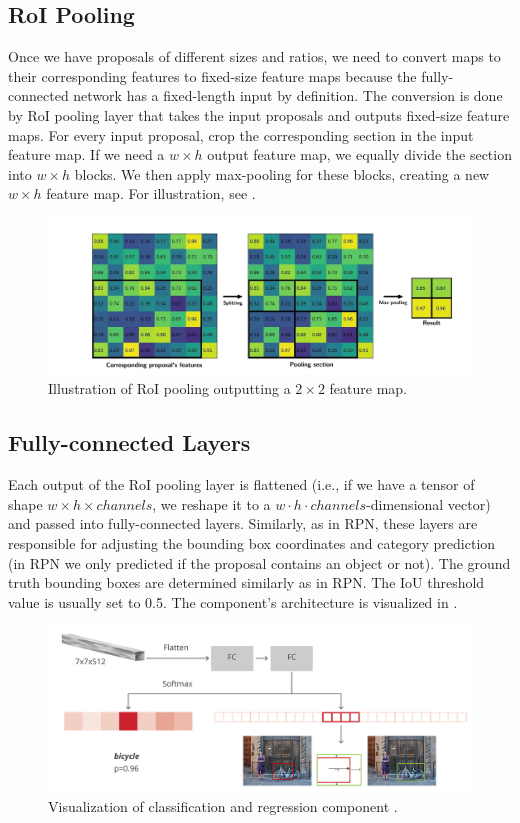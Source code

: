 \subsection{RoI Pooling}
Once we have proposals of different sizes and ratios, we need to convert
maps to their corresponding features to fixed-size feature maps because the
fully-connected network has a fixed-length input by definition. The conversion
is done by RoI pooling layer that takes the input proposals and outputs
fixed-size feature maps.  For every input proposal, crop the corresponding
section in the input feature map. If we need a $w \times h$ output feature
map, we equally divide the section into $w \times h$ blocks. We then apply
max-pooling for these blocks, creating a new $w \times h$ feature map. For
illustration, see .
\begin{figure}[h]
    \centering
    \includegraphics[width=0.9\linewidth]{Sources/Figures/roi.png}
    \caption{Illustration of RoI pooling outputting a $2\times 2$ feature map.
        \cite{roipooling}}
    \label{fig:roipooling}
\end{figure}

\subsection{Fully-connected Layers}
Each output of the RoI pooling layer is flattened (i.e., if we have a
tensor of shape $w \times h\times channels$, we reshape it to a $w \cdot
    h \cdot channels$-dimensional vector) and passed into fully-connected
layers. Similarly, as in RPN, these layers are responsible for adjusting the
bounding box coordinates and category prediction (in RPN we only predicted
if the proposal contains an object or not). The ground truth bounding boxes
are determined similarly as in RPN. The IoU threshold value is usually set
to 0.5. The component's architecture is visualized in .

\begin{figure}[h]
    \centering
    \includegraphics[width=0.8\linewidth]{Sources/Figures/rcnn-architecture.6732b9bd.png}
    \caption{Visualization of classification and regression component \cite{fasterrcnnhead}.}
    \label{fig:rcnn}
\end{figure}

